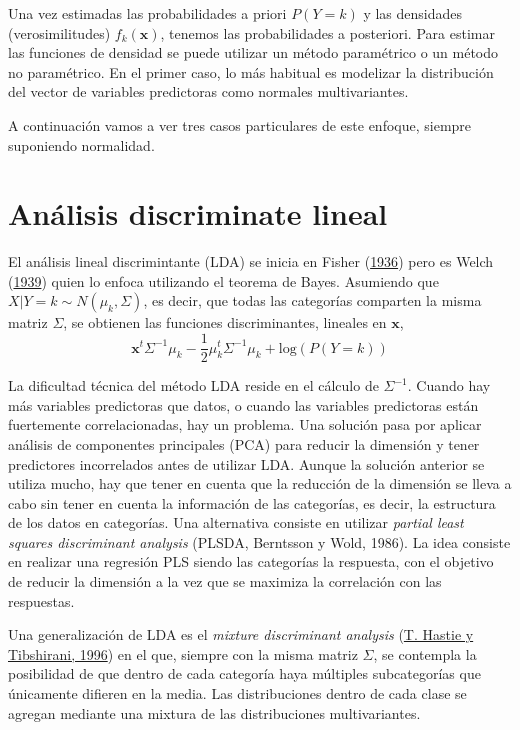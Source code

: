 \documentclass[
]{book}
\theoremstyle{break}
\theoremstyle{nonumberplain}
\begin{document}
Una vez estimadas las probabilidades a priori \(P(Y = k)\) y las densidades (verosimilitudes) \(f_k(\mathbf{x})\), tenemos las probabilidades a posteriori. Para estimar las funciones de densidad se puede utilizar un método paramétrico o un método no paramétrico. En el primer caso, lo más habitual es modelizar la distribución del vector de variables predictoras como normales multivariantes.

A continuación vamos a ver tres casos particulares de este enfoque, siempre suponiendo normalidad.

\hypertarget{clas-lda}{%
\section{Análisis discriminate lineal}\label{clas-lda}}

El análisis lineal discrimintante (LDA) se inicia en Fisher (\protect\hyperlink{ref-fisher1936use}{1936}) pero es Welch (\protect\hyperlink{ref-welch1939note}{1939}) quien lo enfoca utilizando el teorema de Bayes. Asumiendo que \(X | Y = k \sim N(\mu_k, \Sigma)\), es decir, que todas las categorías comparten la misma matriz \(\Sigma\), se obtienen las funciones discriminantes, lineales en \(\mathbf{x}\),
\[\mathbf{x}^t \Sigma^{-1} \mu_k - \frac{1}{2} \mu_k^t \Sigma^{-1} \mu_k + \mbox{log}(P(Y = k))\]

La dificultad técnica del método LDA reside en el cálculo de \(\Sigma^{-1}\). Cuando hay más variables predictoras que datos, o cuando las variables predictoras están fuertemente correlacionadas, hay un problema. Una solución pasa por aplicar análisis de componentes principales (PCA) para reducir la dimensión y tener predictores incorrelados antes de utilizar LDA. Aunque la solución anterior se utiliza mucho, hay que tener en cuenta que la reducción de la dimensión se lleva a cabo sin tener en cuenta la información de las categorías, es decir, la estructura de los datos en categorías. Una alternativa consiste en utilizar \emph{partial least squares discriminant analysis} (PLSDA, Berntsson y Wold, 1986). La idea consiste en realizar una regresión PLS siendo las categorías la respuesta, con el objetivo de reducir la dimensión a la vez que se maximiza la correlación con las respuestas.

Una generalización de LDA es el \emph{mixture discriminant analysis} (\protect\hyperlink{ref-hastie1996fisher}{T. Hastie y Tibshirani, 1996}) en el que, siempre con la misma matriz \(\Sigma\), se contempla la posibilidad de que dentro de cada categoría haya múltiples subcategorías que únicamente difieren en la media. Las distribuciones dentro de cada clase se agregan mediante una mixtura de las distribuciones multivariantes.
\end{document}
